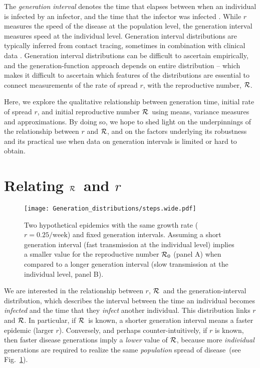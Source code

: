 \documentclass[12pt]{article}
\newcommand{\RR}{\ensuremath{{\cal R}}}
\newcommand{\Rx}[1]{\ensuremath{{\cal R}_{#1}}}
\newcommand{\Ro}{\Rx{0}}
\newcommand{\fref}[1]{Fig.~\ref{fig:#1}}
\begin{document}
The \emph{generation interval} denotes the time that elapses between when an individual is infected by an infector, and the time that the infector was infected \cite{Sven07}.
While $r$ measures the speed of the disease at the population level, the generation interval measures speed at the individual level.
Generation interval distributions are typically inferred from contact tracing, sometimes in combination with clinical data \cite{AylwBarb14,LessOtt16,HubeJohn16}.
Generation interval distributions can be difficult to ascertain empirically, and the generation-function approach depends on entire distribution -- which makes it difficult to ascertain which features of the distributions are essential to connect measurements of the rate of spread $r$, with the reproductive number, \RR.

Here, we explore the qualitative relationship between generation time, initial rate of spread $r$, and initial reproductive number \RR\ using means, variance measures and approximations.
By doing so, we hope to shed light on the underpinnings of the relationship between $r$ and \RR, and on the factors underlying its robustness and its practical use when data on generation intervals is limited or hard to obtain.

\section{Relating \RR\ and $r$}

\begin{figure}[htbp] \centering
	\texttt{[image: Generation\_distributions/steps.wide.pdf]}
	\caption{Two hypothetical epidemics with the same growth rate ($r=0.25/\mathrm{week}$) and fixed generation intervals.  Assuming a short generation interval (fast transmission at the individual level) implies a smaller value for the reproductive number $\Ro$ (panel A) when compared to a longer generation interval (slow transmission at the individual level, panel B). 
	\label{fig:link}}
\end{figure}

We are interested in the relationship between $r$, \RR~and the generation-interval distribution, which describes the interval between the time an individual becomes \emph{infected} and the time that they \emph{infect} another individual.
This distribution links $r$ and \RR. In particular, if \RR~is known, a shorter generation interval means a faster epidemic (larger $r$). Conversely, and perhaps counter-intuitively, if $r$ is known, then faster disease generations imply a \emph{lower} value of \RR, because more \emph{individual} generations are required to realize the same \emph{population} spread of disease~(see \fref{link}).
\end{document}
